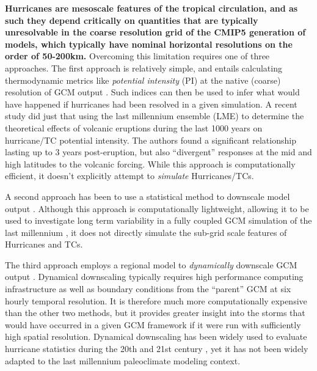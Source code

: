 \documentclass[smallextended]{svjour3}       %
\begin{document}
\textbf{Hurricanes are mesoscale features of the tropical circulation,
  and as such they depend critically on quantities that are typically
  unresolvable in the coarse resolution grid of the CMIP5 generation
  of models, which typically have nominal horizontal resolutions on
  the order of 50-200km.} Overcoming this limitation requires one of
three approaches. The first approach is relatively simple, and entails
calculating thermodynamic metrics like \textit{potential intensity}
(PI) at the native (coarse) resolution of GCM output
\cite{wang,ke_nolan,tang,bister2002}. Such indices can then be used to infer what
would have happened if hurricanes had been resolved in a given
simulation. A recent study \cite{yan2018divergent} 
did just that using the
last millennium ensemble (LME) to determine the theoretical effects of
volcanic eruptions during the last 1000 years on hurricane/TC
potential intensity. The authors found a significant relationship
lasting up to 3 years post-eruption, but also ``divergent'' responses
at the mid and high latitudes to the volcanic forcing. While this
approach is computationally efficient, it doesn't explicitly attempt
to \textit{simulate} Hurricanes/TCs.

A second approach has been to use a statistical method to downscale
model output \cite{down_method_ke,cam_down_ke}. Although this approach
is computationally lightweight, allowing it to be used to investigate
long term variability in a fully coupled GCM simulation of the last
millennium \cite{lme_down_ke}, it does not directly simulate the
sub-grid scale features of Hurricanes and TCs.

The third approach employs a regional model to \textit{dynamically}
downscale GCM output \cite{down_21st_gv}. Dynamical
downscaling typically requires high performance computing
infrastructure as well as boundary conditions from the ``parent'' GCM
at six hourly temporal resolution. It is therefore much more
computationally expensive than the other two methods, but it provides
greater insight into the storms that would have occurred in a given
GCM framework if it were run with sufficiently high spatial
resolution. Dynamical downscaling has been widely used to evaluate
hurricane statistics during the 20th and 21st century \cite{Emanuel12219}, yet
it has not been widely adapted to the last millennium paleoclimate
modeling context.
\end{document}
